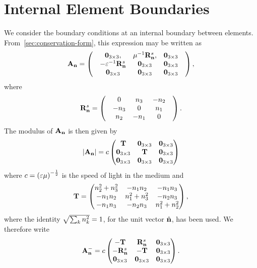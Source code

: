 \section{Internal Element Boundaries}
We consider the boundary conditions at an internal boundary between elements. From~\ref{sec:conservation-form}, this expression may be written as
$$
  \mathbf{A}_\mathbf{n} =
  \begin{pmatrix}
 & \mathbf{0}_{3\times3} , & \mu^{-1} \mathbf{R}^{s}_{\mathbf{n}}, & \mathbf{0}_{3\times3} \\
 & - \varepsilon^{-1} \mathbf{R}^{s}_{\mathbf{n}} & \mathbf{0}_{3\times3} & \mathbf{0}_{3\times3} \\
 & \mathbf{0}_{3\times3} & \mathbf{0}_{3\times3} & \mathbf{0}_{3\times3} 
 & \end{pmatrix} ,
$$
where
$$
  \mathbf{R}^{s}_{\mathbf{n}} =
  \begin{pmatrix}
 & 0 & n_3 & -n_2 \\
 & -n_3 & 0 & n_1 \\
& n_2 & -n_1 & 0 
 & \end{pmatrix} .
$$
The modulus of $\mathbf{A}_\mathbf{n}$ is then given by
\begin{align*}
\left| \mathbf{A}_\mathbf{n} \right| = c
\begin{pmatrix}
  \mathbf{T} & \mathbf{0}_{3\times3} & \mathbf{0}_{3\times3} \\
  \mathbf{0}_{3\times3}  & \mathbf{T} & \mathbf{0}_{3\times3} \\
   \mathbf{0}_{3\times3} & \mathbf{0}_{3\times3} & \mathbf{0}_{3\times3} 
\end{pmatrix}
\end{align*}
where $c = \left( \varepsilon \mu  \right)^{-\frac{1}{2}}$ is the speed of light in the medium and
\begin{align*}
  \mathbf{T} = 
\begin{pmatrix}
n_2^2 + n_3^2 &      -n_1 n_2 &      -n_1 n_3 \\
-n_1 n_2 & n_1^2 + n_3^2 &      -n_2 n_3 \\
-n_1 n_3 &      -n_2 n_3 & n_1^2 + n_2^2 \\
\end{pmatrix} ,
\end{align*}
where the identity $\sqrt{\sum_{k} n_{k}^2} = 1$, for the unit vector $\hat{\mathbf{n}}$, has been used. We therefore write
\begin{align*}
\mathbf{A}_\mathbf{n}^{-} = c
\begin{pmatrix}
  -\mathbf{T} & \mathbf{R}^{s}_{\mathbf{n}} & \mathbf{0}_{3\times3} \\
  -\mathbf{R}^{s}_{\mathbf{n}}  & -\mathbf{T} & \mathbf{0}_{3\times3} \\
   \mathbf{0}_{3\times3} & \mathbf{0}_{3\times3} & \mathbf{0}_{3\times3} 
\end{pmatrix} .
\end{align*}

